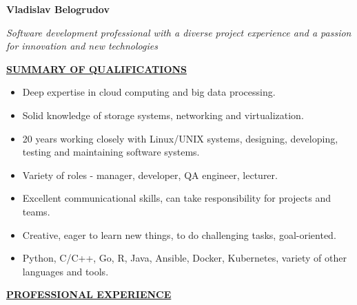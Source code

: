 \documentclass[a4paper,12pt,]{article}
\begin{document}
  \parbox{\textwidth} {
    \parbox[b]{145mm}{
      { \bfseries \LARGE Vladislav Belogrudov}
      \vspace{5ex}

      \large \em
      Software development professional with a diverse project experience and a passion for innovation and new technologies
      \vspace{6ex}
    }
    \hfill
  }

  \uline{ \bfseries{SUMMARY OF QUALIFICATIONS} }
  
  \begin{itemize}
    \item Deep expertise in cloud computing and big data processing.

    \item Solid knowledge of storage systems, networking and virtualization.

    \item 20 years working closely with Linux/UNIX systems,
      designing, developing, testing and maintaining software systems.
     
    \item Variety of roles - manager, developer, QA engineer, lecturer.

    \item Excellent communicational skills, can take responsibility for projects and teams.
      
    \item Creative, eager to learn new things, to do challenging tasks, goal-oriented.

    \item Python, C/C++, Go, R, Java, Ansible, Docker, Kubernetes, variety of other languages and tools.
  \end{itemize}
  
  \vspace{1ex}

  \uline{ \bfseries{PROFESSIONAL EXPERIENCE} }
\end{document}
